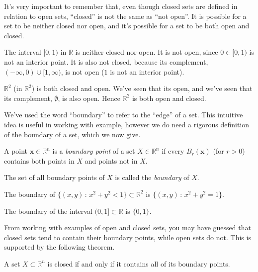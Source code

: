 \documentclass{ximera}
\begin{document}
It's very important to remember that, even though closed sets are defined in relation to open sets, {\color{red}``closed'' is not the same as ``not open''}. It is possible for a set to be neither closed nor open, and it's possible for a set to be both open and closed.

\begin{example}

The interval $[0,1)$ in $\mathbb{R}$ is neither closed nor open. It is not open, since $0\in [0,1)$ is not an interior point. It is also not closed, because its complement, $(-\infty, 0)\cup [1,\infty)$, is not open ($1$ is not an interior point).

$\mathbb{R}^2$ (in $\mathbb{R}^2$) is both closed and open. We've seen that its open, and we've seen that its complement, $\emptyset$, is also open. Hence $\mathbb{R}^2$ is both open and closed.

\end{example} 

We've used the word ``boundary'' to refer to the ``edge'' of a set. This intuitive idea is useful in working with example, however we do need a rigorous definition of the boundary of a set, which we now give.

\begin{definition}
A point $\mathbf{x}\in\mathbb{R}^n$ is a \emph{boundary point} of a set $X\in \mathbb{R}^n$ if every $B_r(\mathbf{x})$ (for $r>0$) contains both points in $X$ and points not in $X$.

The set of all boundary points of $X$ is called the \emph{boundary} of $X$.
\end{definition}

\begin{example}

The boundary of $\{(x,y)\,:\,x^2+y^2<1\}\subset\mathbb{R}^2$ is $\{(x,y)\,:\,x^2+y^2=1\}$. %

The boundary of the interval $(0,1]\subset\mathbb{R}$ is $\{0,1\}$.

\end{example}

From working with examples of open and closed sets, you may have guessed that closed sets tend to contain their boundary points, while open sets do not. This is supported by the following theorem.

\begin{theorem}
A set $X\subset\mathbb{R}^n$ is closed if and only if it contains all of its boundary points.
\end{theorem}
\end{document}
